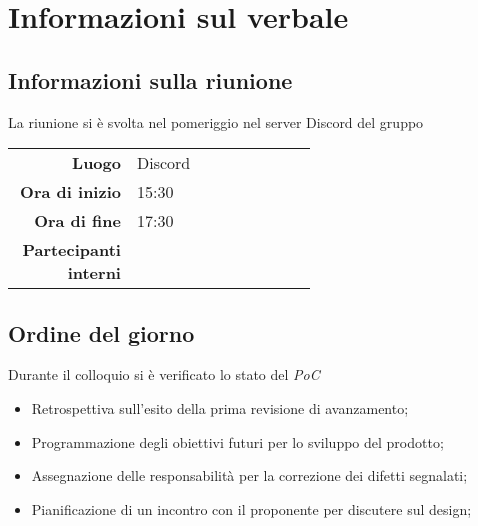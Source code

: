 \section{Informazioni sul verbale}

\subsection{Informazioni sulla riunione}
La riunione si è svolta nel pomeriggio nel server Discord del gruppo

\begin{center}
	\begin{tabular}{r|p{0.6\linewidth}}
		\toprule
		\textbf{Luogo} & Discord \\
		\textbf{Ora di inizio} & 15:30 \\
		\textbf{Ora di fine} & 17:30 \\
		\textbf{Partecipanti interni} & \groupTeam
	\end{tabular}
\end{center}

\medskip

\subsection{Ordine del giorno}
Durante il colloquio si è verificato lo stato del \textit{PoC}
\begin{itemize}
	\item Retrospettiva sull'esito della prima revisione di avanzamento;
	\item Programmazione degli obiettivi futuri per lo sviluppo del prodotto;
	\item Assegnazione delle responsabilità per la correzione dei difetti segnalati;
	\item Pianificazione di un incontro con il proponente per discutere sul design;
\end{itemize}